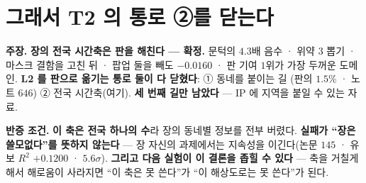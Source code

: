 \documentclass[10pt,a4paper]{article}
\newcommand{\claim}[2]{\begin{claimbox}\textbf{주장.} #1\par\smallskip
  \textcolor{gray!70}{\textbf{반증 조건.} #2}\end{claimbox}}
\begin{document}
\section{그래서 T2 의 통로 ②를 닫는다}

\claim{\textbf{장의 전국 시간축은 판을 해친다 --- 확정.} 문턱의 $4.3$배 음수 · 위약
$3$ 뽑기 · 마스크 결함을 고친 뒤 · 팝업 둘을 빼도 $-0.0160$ · 판 기여 $1$위가 가장
두꺼운 도메인. \textbf{L2 를 판으로 옮기는 통로 둘이 다 닫혔다}: ① 동네를 붙이는 길
(판의 $1.5\%$ · 노트 $646$) ② 전국 시간축(여기). \textbf{세 번째 길만 남았다} ---
IP 에 지역을 붙일 수 있는 자료.}
{\textbf{이 축은 전국 하나의 수}라 장의 동네별 정보를 전부 버렸다. \textbf{실패가
``장은 쓸모없다''를 뜻하지 않는다} --- 장 자신의 과제에서는 지속성을 이긴다(논문
$145$ · 유보 $R^2$ $+0.1200$ · $5.6\sigma$). \textbf{그리고 다음 실험이 이 결론을
좁힐 수 있다} --- 축을 거칠게 해서 해로움이 사라지면 ``이 축은 못 쓴다''가
``이 해상도로는 못 쓴다''가 된다.}
\end{document}
